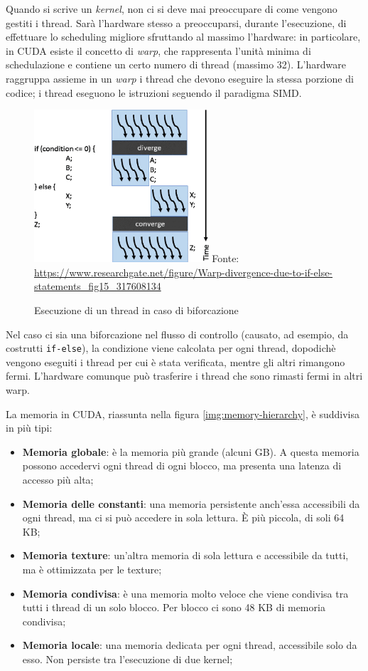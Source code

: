 \documentclass[12pt,a4paper,openright,twoside]{report}
\begin{document}
Quando si scrive un \textit{kernel}, non ci si deve mai preoccupare di come vengono gestiti i thread. Sarà l'hardware stesso a preoccuparsi, durante l'esecuzione, di effettuare lo scheduling migliore sfruttando al massimo l'hardware: in particolare, in CUDA esiste il concetto di \textit{warp}, che rappresenta l'unità minima di schedulazione e contiene un certo numero di thread (massimo 32). L'hardware raggruppa assieme in un \textit{warp} i thread che devono eseguire la stessa porzione di codice; i thread eseguono le istruzioni seguendo il paradigma SIMD.

\begin{figure}[h]
    \centering
    \def\stackalignment{r}
    \stackunder
        {\includegraphics[width=6.5cm]{warp-branch.png}}
        {\scriptsize Fonte: \url{https://www.researchgate.net/figure/Warp-divergence-due-to-if-else-statements_fig15_317608134}}
    \caption{Esecuzione di un thread in caso di biforcazione}
    \label{img:warp-branch}
\end{figure}

Nel caso ci sia una biforcazione nel flusso di controllo (causato, ad esempio, da costrutti \verb|if-else|), la condizione viene calcolata per ogni thread, dopodichè vengono eseguiti i thread per cui è stata verificata, mentre gli altri rimangono fermi. L'hardware comunque può trasferire i thread che sono rimasti fermi in altri warp.

\newpage

La memoria in CUDA, riassunta nella figura \ref{img:memory-hierarchy}, è suddivisa in più tipi:

\begin{itemize}
    \item \textbf{Memoria globale}: è la memoria più grande (alcuni GB). A questa memoria possono accedervi ogni thread di ogni blocco, ma presenta una latenza di accesso più alta;
    \item \textbf{Memoria delle constanti}: una memoria persistente anch'essa accessibili da ogni thread, ma ci si può accedere in sola lettura. È più piccola, di soli 64 KB;
    \item \textbf{Memoria texture}: un'altra memoria di sola lettura e accessibile da tutti, ma è ottimizzata per le texture;
    \item \textbf{Memoria condivisa}: è una memoria molto veloce che viene condivisa tra tutti i thread di un solo blocco. Per blocco ci sono 48 KB di memoria condivisa;
    \item \textbf{Memoria locale}: una memoria dedicata per ogni thread, accessibile solo da esso. Non persiste tra l'esecuzione di due kernel;
\end{itemize}
\end{document}
